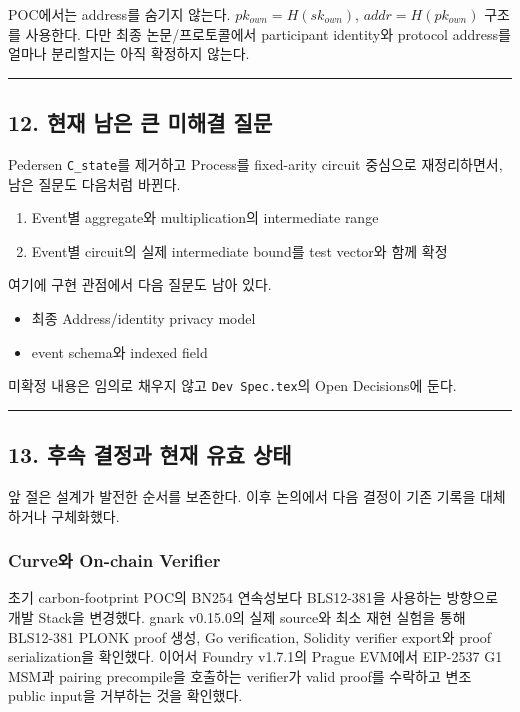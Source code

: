 \documentclass[11pt]{extarticle}
\begin{document}
POC에서는 address를 숨기지 않는다. $pk_{own}=H(sk_{own})$,
$addr=H(pk_{own})$ 구조를 사용한다. 다만 최종
논문/프로토콜에서 participant identity와 protocol address를 얼마나
분리할지는 아직 확정하지 않는다.

\begin{center}\rule{0.5\linewidth}{0.5pt}\end{center}

\subsection{12. 현재 남은 큰 미해결
질문}\label{12-uxd604uxc7ac-uxb0a8uxc740-uxd070-uxbbf8uxd574uxacb0-uxc9c8uxbb38}

Pedersen \texttt{C\_state}를 제거하고 Process를 fixed-arity circuit
중심으로 재정리하면서, 남은 질문도 다음처럼 바뀐다.

\begin{enumerate}
  \item Event별 aggregate와 multiplication의 intermediate range
  \item Event별 circuit의 실제 intermediate bound를 test vector와 함께 확정
\end{enumerate}

여기에 구현 관점에서 다음 질문도 남아 있다.

\begin{itemize}
  \item 최종 Address/identity privacy model
  \item event schema와 indexed field
\end{itemize}

미확정 내용은 임의로 채우지 않고
\texttt{Dev Spec.tex}의 Open Decisions에 둔다.

\begin{center}\rule{0.5\linewidth}{0.5pt}\end{center}

\subsection{13. 후속 결정과 현재 유효 상태}

앞 절은 설계가 발전한 순서를 보존한다. 이후 논의에서 다음 결정이 기존 기록을
대체하거나 구체화했다.

\subsubsection{Curve와 On-chain Verifier}

초기 carbon-footprint POC의 BN254 연속성보다 BLS12-381을 사용하는 방향으로
개발 Stack을 변경했다. gnark v0.15.0의 실제 source와 최소 재현 실험을 통해
BLS12-381 PLONK proof 생성, Go verification, Solidity verifier export와
proof serialization을 확인했다. 이어서 Foundry v1.7.1의 Prague EVM에서
EIP-2537 G1 MSM과 pairing precompile을 호출하는 verifier가 valid proof를
수락하고 변조 public input을 거부하는 것을 확인했다.
\end{document}
